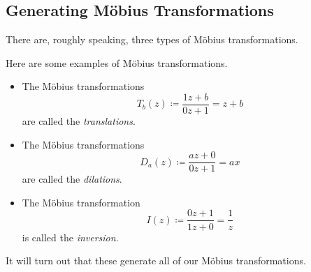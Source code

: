 \subsection{Generating M\"obius Transformations}
There are, roughly speaking, three types of M\"obius transformations.
\begin{definition}
	Here are some examples of M\"obius transformations.
	\begin{itemize}
		\item The M\"obius transformations
		\[T_b(z)\coloneqq\frac{1z+b}{0z+1}=z+b\]
		are called the \textit{translations}.
		\item The M\"obius transformations
		\[D_a(z)\coloneqq\frac{az+0}{0z+1}=ax\]
		are called the \textit{dilations}.
		\item The M\"obius transformation
		\[I(z)\coloneqq\frac{0z+1}{1z+0}=\frac1z\]
		is called the \textit{inversion}.
	\end{itemize}
\end{definition}
It will turn out that these generate all of our M\"obius transformations.

